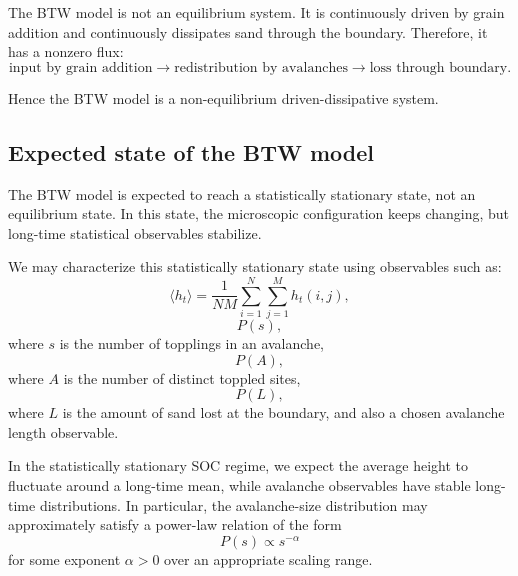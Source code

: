 The BTW model is not an equilibrium system. It is continuously driven by grain addition and continuously dissipates sand through the boundary. Therefore, it has a nonzero flux:
\[
    \text{input by grain addition}
    \longrightarrow
    \text{redistribution by avalanches}
    \longrightarrow
    \text{loss through boundary}.
\]

Hence the BTW model is a non-equilibrium driven-dissipative system.

\subsection*{Expected state of the BTW model}

The BTW model is expected to reach a statistically stationary state, not an equilibrium state. In this state, the microscopic configuration keeps changing, but long-time statistical observables stabilize.

We may characterize this statistically stationary state using observables such as:
\[
    \langle h_t\rangle
    =
    \frac{1}{NM}\sum_{i=1}^{N}\sum_{j=1}^{M}h_t(i,j),
\]
\[
    P(s),
\]
where $s$ is the number of topplings in an avalanche,
\[
    P(A),
\]
where $A$ is the number of distinct toppled sites,
\[
    P(L),
\]
where $L$ is the amount of sand lost at the boundary, and also a chosen avalanche length observable.

In the statistically stationary SOC regime, we expect the average height to fluctuate around a long-time mean, while avalanche observables have stable long-time distributions. In particular, the avalanche-size distribution may approximately satisfy a power-law relation of the form
\[
    P(s)\propto s^{-\alpha}
\]
for some exponent $\alpha>0$ over an appropriate scaling range.

